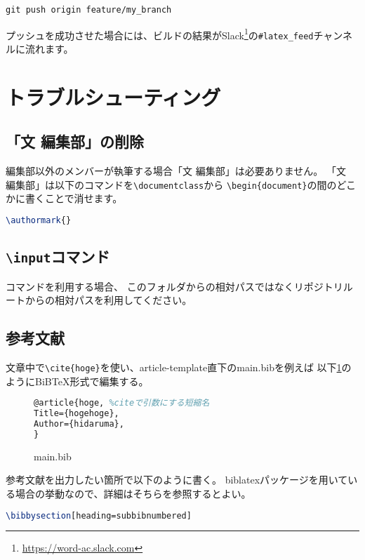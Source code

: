 \documentclass[../../main]{subfiles}
\begin{document}
\begin{lstlisting}[mathescape]
git push origin feature/my_branch
\end{lstlisting}

プッシュを成功させた場合には、ビルドの結果がSlack\footnote{\url{https://word-ac.slack.com}}の\texttt{\#latex\_feed}チャンネルに流れます。

\section{トラブルシューティング}

\subsection{「文 編集部」の削除}

編集部以外のメンバーが執筆する場合「文 編集部」は必要ありません。
「文　編集部」は以下のコマンドを\lstinline|\documentclass|から
\lstinline|\begin{document}|の間のどこかに書くことで消せます。

\begin{lstlisting}[language=TeX, mathescape]
\authormark{}    
\end{lstlisting}

\subsection{\texttt{\textbackslash input}コマンド}

\lstinline||コマンドを利用する場合、
このフォルダからの相対パスではなくリポジトリルートからの相対パスを利用してください。

\subsection{参考文献}
文章中で\lstinline$\cite{hoge}$を使い、article-template直下のmain.bibを例えば
以下\ref{bibtex}のようにBiB\TeX 形式で編集する。

\begin{figure}
\begin{lstlisting}[language=TeX, mathescape,]
@article{hoge, %citeで引数にする短縮名
Title={hogehoge},
Author={hidaruma},
}
\end{lstlisting}
\label{bibtex}
\caption{main.bib}
\end{figure}
参考文献を出力したい箇所で以下のように書く。
biblatexパッケージを用いている場合の挙動なので、詳細はそちらを参照するとよい。
\begin{lstlisting}[language=TeX, mathescape]
\bibbysection[heading=subbibnumbered]
\end{lstlisting}
\end{document}
